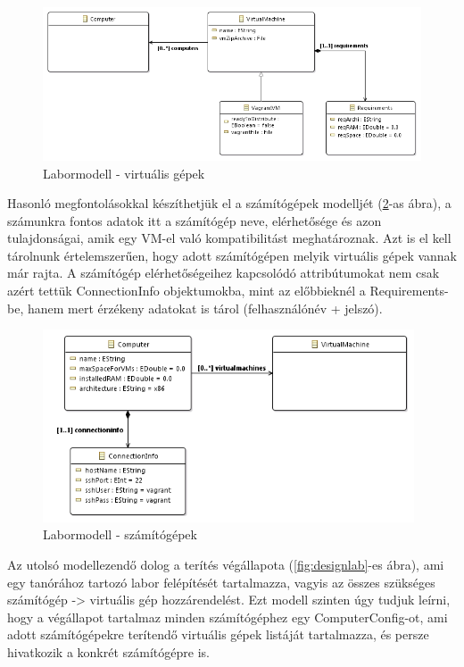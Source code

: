 \begin{figure}[ht]
	\centering
	\includegraphics[width=130mm, keepaspectratio]{figures/design_vm.png}
	\caption{Labormodell - virtuális gépek}
	\label{fig:designvm}
\end{figure}

Hasonló megfontolásokkal készíthetjük el a számítógépek modelljét (\ref{fig:designcomputers}-as ábra), a számunkra fontos adatok itt a számítógép neve, elérhetősége és azon tulajdonságai, amik egy VM-el való kompatibilitást meghatároznak. Azt is el kell tárolnunk értelemszerűen, hogy adott számítógépen melyik virtuális gépek vannak már rajta. A számítógép elérhetőségeihez kapcsolódó attribútumokat nem csak azért tettük ConnectionInfo objektumokba, mint az előbbieknél a Requirements-be, hanem mert érzékeny adatokat is tárol (felhasználónév + jelszó).

\begin{figure}[ht]
	\centering
	\includegraphics[width=110mm, keepaspectratio]{figures/design_computer.png}
	\caption{Labormodell - számítógépek}
	\label{fig:designcomputers}
\end{figure}

Az utolsó modellezendő dolog a terítés végállapota (\ref{fig:designlab}-es ábra), ami egy tanórához tartozó labor felépítését tartalmazza, vagyis az összes szükséges számítógép -> virtuális gép hozzárendelést. Ezt modell szinten úgy tudjuk leírni, hogy a végállapot tartalmaz minden számítógéphez egy ComputerConfig-ot, ami adott számítógépekre terítendő virtuális gépek listáját tartalmazza, és persze hivatkozik a konkrét számítógépre is.

